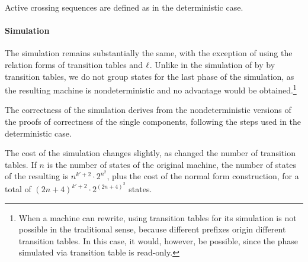 Active crossing sequences are defined as in the deterministic case.

\paragraph{Simulation} The simulation remains substantially the same, with the exception of using the relation forms of transition tables and $\ell$.
Unlike in the simulation of \TNFAs by \ODFAs by transition tables, we do not group states for the last phase of the simulation, as the resulting machine is nondeterministic and no advantage would be obtained.\footnote{%
	When a machine can rewrite, using transition tables for its simulation is not possible in the traditional sense, because different prefixes origin different transition tables.
	In this case, it would, however, be possible, since the phase simulated via transition table is read-only.}

The correctness of the simulation derives from the nondeterministic versions of the proofs of correctness of the single components, following the steps used in the deterministic case.

The cost of the simulation changes slightly, as changed the number of transition tables.
If $n$ is the number of states of the original machine, the number of states of the resulting \ONFAs is $n^{k'+2}\cdot2^{n^2}$, plus the cost of the normal form construction, for a total of $(2n+4)^{k'+2}\cdot2^{(2n+4)^2}$ states.
